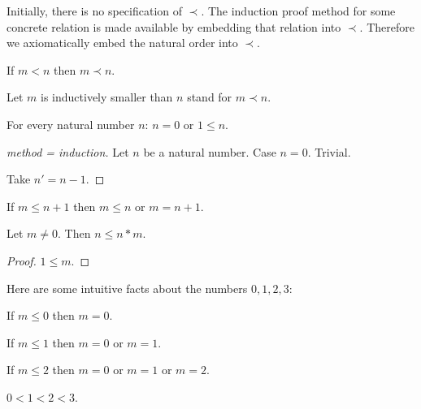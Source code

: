 \documentclass[english,11pt]{article}
\begin{document}
Initially, there is no specification of $\prec$.
The induction proof method for some concrete relation 
is made available by embedding that relation
into $\prec$. Therefore we axiomatically embed the natural
order into $\prec$.

\begin{forthel}
\begin{axiom}
If $m < n$ then $m \prec n$.
\end{axiom}

Let $m$ is inductively smaller than $n$ stand for $m \prec n$.

\end{forthel}

\begin{forthel}

\begin{lemma}
For every natural number $n$: $n = 0$ or $1 \leq n$.
\end{lemma}
\begin{proof}[method = induction]
Let $n$ be a natural number.
Case $n = 0$. Trivial.

Take $n' = n - 1$. 
\end{proof}

\begin{lemma}
If $m \leq n+1$ then $m \leq n$ or $m = n+1$.
\end{lemma}


\begin{lemma}
Let $m \neq 0$. Then $n \leq n * m$.
\end{lemma}
\begin{proof}
$1 \leq m$.
\end{proof}
\end{forthel}

Here are some intuitive facts about the numbers $0,1,2,3$:

\begin{forthel}
\begin{lemma}
If $m \leq 0$ then $m = 0$.
\end{lemma}

\begin{lemma}
If $m \leq 1$ then $m = 0$ or $m = 1$.
\end{lemma}

\begin{lemma}
If $m \leq 2$ then $m = 0$ or $m = 1$ or $m = 2$.
\end{lemma}

\begin{lemma}
$0 < 1 < 2 < 3$.
\end{lemma}

\end{forthel}
\end{document}

